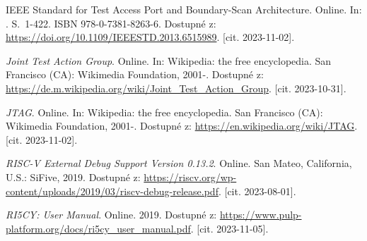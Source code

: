 

\begin{thebibliography}{99}

IEEE Standard for Test Access Port and Boundary-Scan Architecture. Online. In: . S.~1-422. ISBN 978-0-7381-8263-6. Dostupné z: \url{https://doi.org/10.1109/IEEESTD.2013.6515989}. [cit. 2023-11-02].

\textit{Joint Test Action Group}. Online. In: Wikipedia: the free encyclopedia. San Francisco (CA): Wikimedia Foundation, 2001-. Dostupné z: \url{https://de.m.wikipedia.org/wiki/Joint\_Test\_Action\_Group}. [cit. 2023-10-31].

\textit{JTAG}. Online. In: Wikipedia: the free encyclopedia. San Francisco (CA): Wikimedia Foundation, 2001-. Dostupné z: \url{https://en.wikipedia.org/wiki/JTAG}. [cit. 2023-11-02].

\textit{RISC-V External Debug Support Version 0.13.2}. Online. San Mateo, California, U.S.: SiFive, 2019. Dostupné z: \url{https://riscv.org/wp-content/uploads/2019/03/riscv-debug-release.pdf}. [cit. 2023-08-01].

\textit{RI5CY: User Manual}. Online. 2019. Dostupné z: \url{https://www.pulp-platform.org/docs/ri5cy\_user\_manual.pdf}. [cit. 2023-11-05].

\end{thebibliography}


%
%
%
